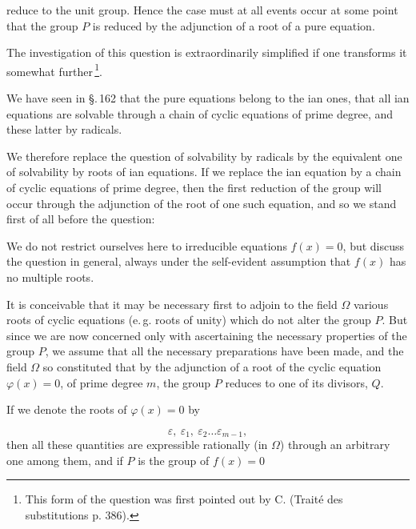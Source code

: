 
reduce to the unit group. Hence the case must at all events
occur at some point that the group $P$ is reduced by the adjunction
of a root of a pure equation.

The investigation of this question is extraordinarily simplified
if one transforms it somewhat further\,\footnote{This form of the question was first pointed out by C.  (Trait\'e des substitutions p. 386).}.

We have seen in \S.\,162 that the pure equations belong to the
ian ones, that all ian equations are solvable through a
chain of cyclic equations of prime degree, and these latter
by radicals.

We therefore replace the question of solvability by radicals
by the equivalent one of solvability by roots of ian
equations. If we replace the ian equation by a chain of
cyclic equations of prime degree, then the first reduction of the
group will occur through the adjunction of the root of one such
equation, and so we stand first of all before the question:


We do not restrict ourselves here to irreducible equations
$f(x) = 0$, but discuss the question in general, always under the
self-evident assumption that $f(x)$ has no multiple
roots.

It is conceivable that it may be necessary first to adjoin to
the field $\Omega$ various roots of cyclic equations (e.\,g. roots of unity)
which do not alter the group $P$. But since we are now
concerned only with ascertaining the necessary properties of the
group $P$, we assume that all the necessary preparations
have been made, and the field $\Omega$ so constituted
that by the adjunction of a root of the cyclic equation
$\varphi(x) = 0$, of prime degree $m$, the group $P$ reduces to
one of its divisors, $Q$.

If we denote the roots of $\varphi(x) = 0$ by

\[
\varepsilon,\ \varepsilon_1,\ \varepsilon_2 \ldots \varepsilon_{m-1},
\]
then all these quantities are expressible rationally (in $\Omega$)
through an arbitrary one among them, and if $P$ is the group of
$f(x) = 0$
